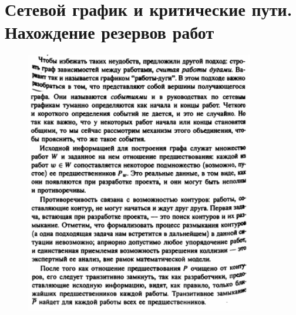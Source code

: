 \documentclass[discrete.tex]{subfiles}
\begin{document}
  \section{Сетевой график и критические пути. Нахождение резервов работ}

  \begin{task}

  \end{task}

  \begin{alg}

  \end{alg}

  \begin{figure}[H]
          \includegraphics[width=10cm]{pics/48_1}
          \centering
  \end{figure}
\end{document}
